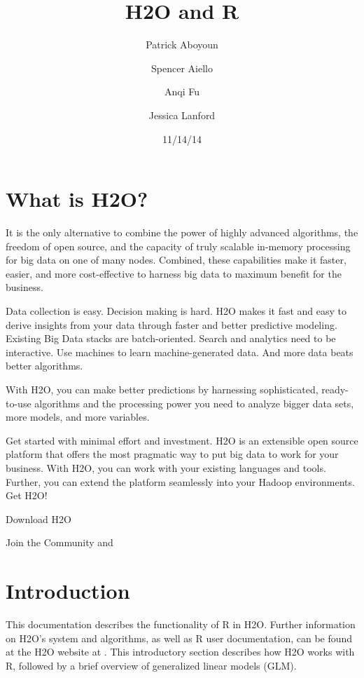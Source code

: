 \documentclass[11pt]{article}
\begin{document}
\title{H2O and R}
\author{Patrick Aboyoun}
\author{Spencer Aiello}
\author{Anqi Fu}
\author{Jessica Lanford}
\date{11/14/14}
\maketitle



\section{What is H2O?}

It is the only alternative to combine the power of highly advanced algorithms, the freedom of open source, and the capacity of truly scalable in-memory processing for big data on one of many nodes. Combined, these capabilities make it faster, easier, and more cost-effective to harness big data to maximum benefit for the business. 

Data collection is easy. Decision making is hard. H2O makes it fast and easy to derive insights from your data through faster and better predictive modeling. Existing Big Data stacks are batch-oriented. Search and analytics need to be interactive. Use machines to learn machine-generated data. And more data beats better algorithms. 

With H2O, you can make better predictions by harnessing sophisticated, ready-to-use algorithms and the processing power you need to analyze bigger data sets, more models, and more variables. 

Get started with minimal effort and investment. H2O is an extensible open source platform that offers the most pragmatic way to put big data to work for your business. With H2O, you can work with your existing languages and tools. Further, you can extend the platform seamlessly into your Hadoop environments. Get H2O!

Download H2O

Join the Community
 and 

\section{Introduction}

This documentation describes the functionality of R in H2O. Further information on H2O's system and algorithms, as well as R user documentation, can be found at the H2O website at . This introductory section describes how H2O works with R, followed by a brief overview of generalized linear models (GLM). 
\end{document}
